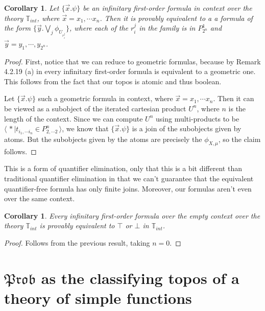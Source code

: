 \documentclass[a4paper]{amsproc}
\theoremstyle{plain}
\newtheorem{corollary}[theorem]{Corollary}
\theoremstyle{definition}
\theoremstyle{remark}
\numberwithin{equation}{section}
\DeclareMathOperator{\Sh}{Sh}
\newcommand{\Set}{\textup{\textsf{Set}}}
\newcommand{\Prob}{\mathfrak{Prob}}
\newcommand{\la}{\langle\,}
\newcommand{\ra}{\,\rangle}
\begin{document}
\begin{corollary}
    Let $\{ \vec{x} . \psi\}$ be an infinitary first-order formula in context over the theory $\mathbb{T}_{int}$, where $\vec{x} = x_1, \cdots x_n$. Then it is provably equivalent to a a formula of the form $\{\vec{y} . \bigvee_j \phi_{U_{r_i^j}} \}$, where each of the $r_i^j$ in the family is in $P^1_{2^n}$ and $\vec{y} = y_1,\cdots,y_{2^n}$.
\end{corollary}
\begin{proof}
    First, notice that we can reduce to geometric formulas, because by Remark 4.2.19 (a) in \cite{caramello_book} every infinitary first-order formula is equivalent to a geometric one. This follows from the fact that our topos is atomic and thus boolean.

    Let $\{ \vec{x} . \psi\}$ such a geometric formula in context, where $\vec{x} = x_1, \cdots x_n$. Then it can be viewed as a subobject of the iterated cartesian product $U^n$, where $n$ is the length of the context. Since we can compute $U^n$ using multi-products to be $\la * \mid t_{i_1,\cdots i_n} \in P^n_{2,\cdots 2} \ra$, we know that $\{ \vec{x} . \psi\}$ is a join of the subobjects given by atoms. But the subobjects given by the atoms are precisely the $\phi_{X,\mu}$, so the claim follows.
\end{proof}

This is a form of quantifier elimination, only that this is a bit different than traditional quantifier elimination in that we can't guarantee that the equivalent quantifier-free formula has only finite joins. Moreover, our formulas aren't even over the same context.

\begin{corollary}
    Every infinitary first-order formula over the empty context over the theory $\mathbb{T}_{int}$ is provably equivalent to $\top$ or $\bot$ in $\mathbb{T}_{int}$.
\end{corollary}
\begin{proof}
    Follows from the previous result, taking $n=0$.
\end{proof}

\section{$\Prob$ as the classifying topos of a theory of simple functions}
\end{document}
